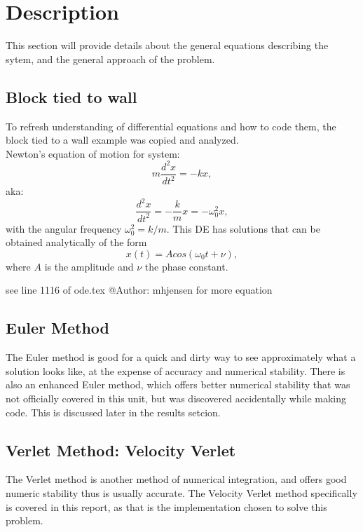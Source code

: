 \documentclass[12pt]{article} %
\begin{document}
\section{Description}
This section will provide details about the general equations describing the sytem, and the general approach of the problem.

\subsection{Block tied to wall}
To refresh understanding of differential equations and how to code them, the block tied to a wall example was copied and analyzed.\\
Newton's equation of motion for system:
\[
m\frac{d^2x}{dt^2}=-kx,
\]
aka:
\[
\frac{d^2x}{dt^2}=-\frac{k}{m}x=-\omega_0^2x,
\label{eq:newton1}
\]
with the angular frequency $\omega_0^2=k/m$.
This DE has solutions that can be obtained analytically of the form
\[
	x(t)=Acos(\omega_0t+\nu),
\]
where $A$ is the amplitude and $\nu$ the phase constant.	

see line 1116 of ode.tex @Author: mhjensen for more equation

\subsection{Euler Method}
The Euler method is good for a quick and dirty way to see approximately what a solution looks like, at the expense of accuracy and numerical stability. There is also an enhanced Euler method, which offers better numerical stability that was not officially covered in this unit, but was discovered accidentally while making code. This is discussed later in the results setcion.

\subsection{Verlet Method: Velocity Verlet}
The Verlet method is another method of numerical integration, and offers good numeric stability thus is usually accurate. The Velocity Verlet method specifically is covered in this report, as that is the implementation chosen to solve this problem.
\end{document}
